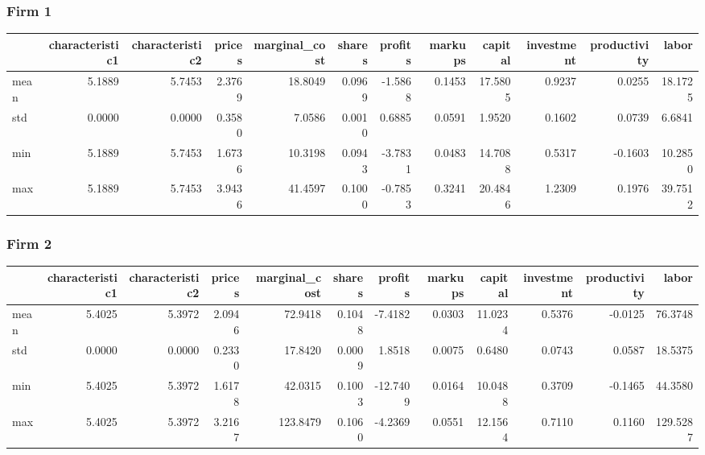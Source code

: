  \subsubsection*{Firm 1}
\begin{tabular}{lrrrrrrrrrrr}
\toprule
{} &  characteristic1 &  characteristic2 &  prices &  marginal\_cost &  shares &  profits &  markups &  capital &  investment &  productivity &   labor \\
\midrule
mean &           5.1889 &           5.7453 &  2.3769 &        18.8049 &  0.0969 &  -1.5868 &   0.1453 &  17.5805 &      0.9237 &        0.0255 & 18.1725 \\
std  &           0.0000 &           0.0000 &  0.3580 &         7.0586 &  0.0010 &   0.6885 &   0.0591 &   1.9520 &      0.1602 &        0.0739 &  6.6841 \\
min  &           5.1889 &           5.7453 &  1.6736 &        10.3198 &  0.0943 &  -3.7831 &   0.0483 &  14.7088 &      0.5317 &       -0.1603 & 10.2850 \\
max  &           5.1889 &           5.7453 &  3.9436 &        41.4597 &  0.1000 &  -0.7853 &   0.3241 &  20.4846 &      1.2309 &        0.1976 & 39.7512 \\
\bottomrule
\end{tabular}


 \subsubsection*{Firm 2}
\begin{tabular}{lrrrrrrrrrrr}
\toprule
{} &  characteristic1 &  characteristic2 &  prices &  marginal\_cost &  shares &  profits &  markups &  capital &  investment &  productivity &    labor \\
\midrule
mean &           5.4025 &           5.3972 &  2.0946 &        72.9418 &  0.1048 &  -7.4182 &   0.0303 &  11.0234 &      0.5376 &       -0.0125 &  76.3748 \\
std  &           0.0000 &           0.0000 &  0.2330 &        17.8420 &  0.0009 &   1.8518 &   0.0075 &   0.6480 &      0.0743 &        0.0587 &  18.5375 \\
min  &           5.4025 &           5.3972 &  1.6178 &        42.0315 &  0.1003 & -12.7409 &   0.0164 &  10.0488 &      0.3709 &       -0.1465 &  44.3580 \\
max  &           5.4025 &           5.3972 &  3.2167 &       123.8479 &  0.1060 &  -4.2369 &   0.0551 &  12.1564 &      0.7110 &        0.1160 & 129.5287 \\
\bottomrule
\end{tabular}


